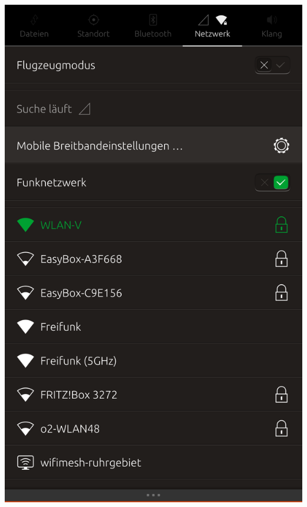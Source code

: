 \documentclass{beamer}
\begin{document}
\begin{frame}
\begin{columns}
      \includegraphics[width=\textwidth]{images/wlan}

\end{columns}
\end{frame}
\end{document}
